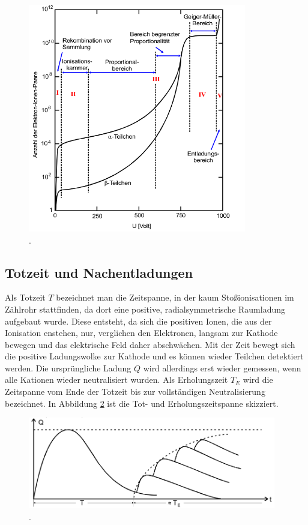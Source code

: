 \begin{figure}
  \centering
  \includegraphics[height=10cm]{MeinePics;)/EU.png}
  \caption{.\cite{anleitung}}
  \label{fig:EU}
\end{figure}

\FloatBarrier

\subsection{Totzeit und Nachentladungen}

Als Totzeit $T$ bezeichnet man die Zeitspanne, in der kaum Stoßionisationen im
Zählrohr stattfinden, da dort eine positive, radialsymmetrische Raumladung
aufgebaut wurde. Diese entsteht, da sich die positiven Ionen,
die aus der Ionisation enstehen, nur, verglichen den Elektronen, langsam
zur Kathode bewegen und das elektrische Feld daher abschwächen.
Mit der Zeit bewegt sich die positive Ladungswolke zur Kathode und
es können wieder Teilchen detektiert werden.
Die ursprüngliche Ladung $Q$ wird allerdings erst wieder gemessen, wenn alle
Kationen wieder neutralisiert wurden. Als Erholungszeit $T_E$ wird die
Zeitspanne vom Ende der Totzeit bis zur vollständigen Neutralisierung
bezeichnet.
In Abbildung \ref{fig:TOT} ist die Tot- und Erholungszeitspanne skizziert.

\begin{figure}
  \centering
  \includegraphics[height=4cm]{MeinePics;)/TOT.png}
  \caption{.\cite{anleitung}}
  \label{fig:TOT}
\end{figure}

